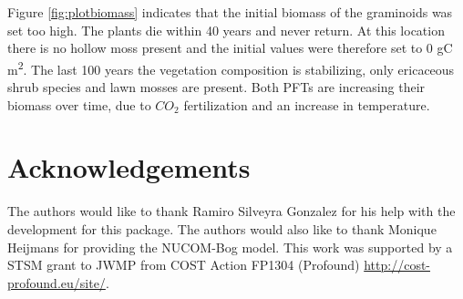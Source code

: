 \documentclass{article}\usepackage[]{graphicx}\usepackage[]{color}
\begin{document}
Figure \ref{fig:plotbiomass} indicates that the initial biomass of the graminoids was set too high. The plants die within 40 years and never return. At this location there is no hollow moss present and the initial values were therefore set to 0 gC m\textsuperscript{2}. The last 100 years the  vegetation composition is stabilizing, only ericaceous shrub species and lawn mosses are present. Both PFTs are increasing their biomass over time, due to ${CO_2}$ fertilization and an increase in temperature.



\section{Acknowledgements}
The authors would like to thank Ramiro Silveyra Gonzalez for his help with the development for this package. The authors would also like to thank Monique Heijmans for providing the NUCOM-Bog model. This work was supported by a STSM grant to JWMP from COST Action FP1304 (Profound) \url{http://cost-profound.eu/site/}.



\end{document}
